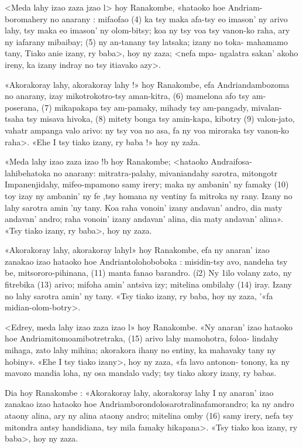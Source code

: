 <Meda lahy izao zaza jzao l> hoy Ranakombe, «hataoko hoe Andriam-
boromahery no anarany : mifaofao (4) ka tsy maka afa-tsy eo imason' ny
arivo lahy, tsy maka eo imason' ny olom-bitsy; koa ny tsy voa tsy vanon-ko
raha, ary ny iafarany mibaibay; (5) ny an-tanany tsy latsaka; izany no toka-
mahamamo tany, Tiako anie izany, ry baba>, hoy ny zaza; <nefa mpa-
ngalatra sakan' akoho ireny, ka izany indray no tsy itiavako azy>.

«Akorakoray lahy, akorakoray lahy !» hoy Ranakombe, efa
Andriandambozoma no anarany, izay mikotrokotro-tsy aman-kitra, (6)
mamelona afo tsy am-poserana, (7) mikapakapa tsy am-pamaky, mihady
tsy am-pangady, mivalan-tsaha tsy misava hivoka, (8) mitety bonga tsy
amin-kapa, kibotry (9) valon-jato, vahatr ampanga valo arivo: ny tsy voa
no asa, fa ny voa miroraka tsy vanon-ko raha>. «Ehe I tsy tiako izany, ry
baba !» hoy ny zaža.

«Meda lahy izao zaza izao !b hoy Ranakombe; <hataoko Andraifosa-
lahibehatoka no anarany: mitratra-palahy, mivaniandahy sarotra, mitongotr
Impanenjidahy, mifeo-mpamono samy irery; maka ny ambanin' ny famaky
(10) toy izay ny ambanin' ny fe ,tsy homana ny ventiny fa mitroka ny rany.
Izany no lahy sarotra amin 'ny tany. Koa raha vonoin' izany andavan'
andro, dia maty andavan' andro; raha vonoin' izany andavan' alina, dia
maty andavan' alina». «Tsy tiako izany, ry baba>, hoy ny zaza.

«Akorakoray lahy, akorakoray lahyl» hoy Ranakombe, efa ny anaran'
izao zanakao izao hataoko hoe Andriantolohoboboka : misidin-tsy avo,
nandeha tsy be, mitsororo-pihinana, (11) manta fanao barandro. (í2) Ny
1ilo volany zato, ny fitrebika (13) arivo; mifoha amin' antsiva izy; mitelina
ombilahy (14) iray. Izany no lahy sarotra amin' ny tany. «Tsy tiako izany,
ry baba, hoy ny zaza, '«fa midian-olom-botry>.

<Edrey, meda lahy izao zaza izao l» hoy Ranakombe. «Ny anaran' izao
hataoko hoe Andriamitomoamibotretraka, (15) arivo lahy mamohotra, foloa-
lindahy mihaga, zato lahy mihina; akorakora ihany no entiny, ka mahavaky
tany ny hobiny». «Ehe I tsy tiako izany>, hoy ny zaza, «fa lavo antonon-
tonony, ka ny mavozo mandia loha, ny osa mandalo vady; tsy tiako akory
izany, ry babas.

Dia hoy Ranakombe : «Akorakoray lahy, akorakoray lahy I ny anaran'
izao zanakao izao hataoko hoe Andriamborondolosarotralinafamorandro; ka
ny andro ataony alina, ary ny alina ataony andro; mitelina omby (16) samy
irery, nefa tsy mitondra antsy handidiana, tsy mila famaky hikapana>. «Tsy
tiako koa izany, ry baba>, hoy ny zaza.

